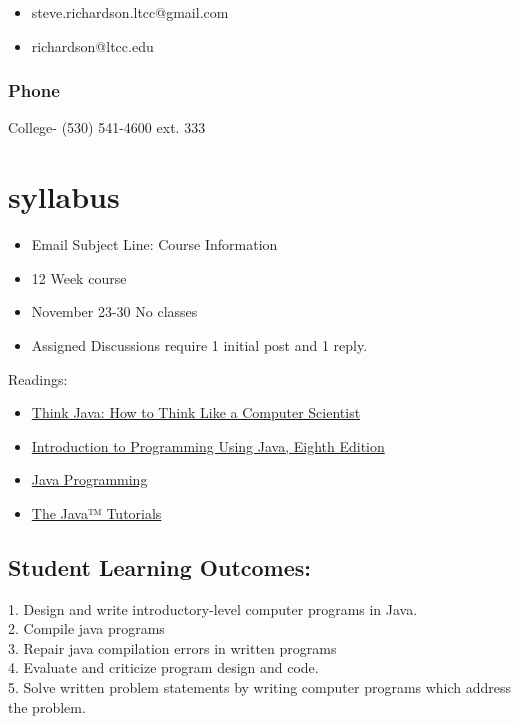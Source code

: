 \documentclass{article}
\begin{document}
\begin{itemize}
\item steve.richardson.ltcc@gmail.com
\item richardson@ltcc.edu
\end{itemize}

\subsubsection{Phone}

College-
(530) 541-4600 ext. 333

\section{syllabus}
\begin{itemize}
	\item Email Subject Line: Course Information
	\item 12 Week course
	\item November 23-30 No classes
	\item Assigned Discussions require 1 initial post and 1 reply. 
\end{itemize}
Readings:
\begin{itemize}
	\item \href{https://www.stevenlrichardson.com/TJ2T/}{Think Java: How to Think Like a Computer Scientist}
	\item \href{https://www.stevenlrichardson.com/IPJ/}{Introduction to Programming Using Java, Eighth Edition}
	\item \href{https://en.wikibooks.org/wiki/Java_Programming}{Java Programming}
	\item \href{https://docs.oracle.com/javase/tutorial/}{The Java™ Tutorials}
\end{itemize}

\subsection{Student Learning Outcomes:}

1. Design and write introductory-level computer programs in Java.
\\
2. Compile java programs
\\
3. Repair java compilation errors in written programs
\\
4. Evaluate and criticize program design and code.
\\
5. Solve written problem statements by writing computer programs which address the problem.
\end{document}
